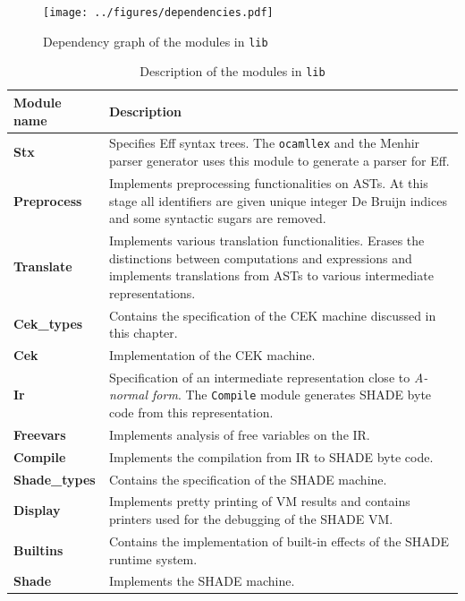 \documentclass[class=article, crop=false]{standalone}
\begin{document}
\begin{figure}
    \centering
    \texttt{[image: ../figures/dependencies.pdf]}
    \caption{Dependency graph of the modules in \texttt{lib}}
    \label{fig:dependencies}
\end{figure}

\begin{table}
    \centering
    {\renewcommand{\arraystretch}{1.3}
    \begin{tabular}{p{3cm}p{10cm}}
    \toprule
    \textbf{Module name} & \textbf{Description} \\
    \midrule
    \textbf{Stx} & 
        Specifies Eff syntax trees. The \verb|ocamllex| and the Menhir parser
        generator uses this module to generate a parser for Eff.  \\
    \textbf{Preprocess} &
        Implements preprocessing functionalities on ASTs. At this stage all
        identifiers are given unique integer De Bruijn indices
        and some syntactic sugars are removed.  \\
    \textbf{Translate} &
        Implements various translation functionalities. Erases the distinctions
        between computations and expressions and implements translations from
        ASTs to various intermediate representations. \\
    \textbf{Cek\_types} & Contains the specification of the CEK machine
        discussed in this chapter. \\
    \textbf{Cek} & Implementation of the CEK machine. \\
    \textbf{Ir} &
        Specification of an intermediate representation close to \emph{A-normal
        form}. The \verb|Compile| module generates SHADE byte code from this
        representation. \\
    \textbf{Freevars} &
        Implements analysis of free variables on the IR. \\
    \textbf{Compile} & Implements the compilation from IR to SHADE byte code. \\
    \textbf{Shade\_types} & Contains the specification of the SHADE machine. \\
    \textbf{Display} & Implements pretty printing of VM results and contains
        printers used for the debugging of the SHADE VM. \\
    \textbf{Builtins} & Contains the implementation of built-in effects of the
        SHADE runtime system. \\
    \textbf{Shade} & Implements the SHADE machine. \\
    \bottomrule
    \end{tabular}}
    \caption{Description of the modules in \texttt{lib}}
    \label{tab:lib-modules}
\end{table}
\end{document}
